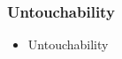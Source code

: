 \begin{frame}

\frametitle{Untouchability}


\begin{itemize}
\item Untouchability



\end{itemize}

\end{frame}